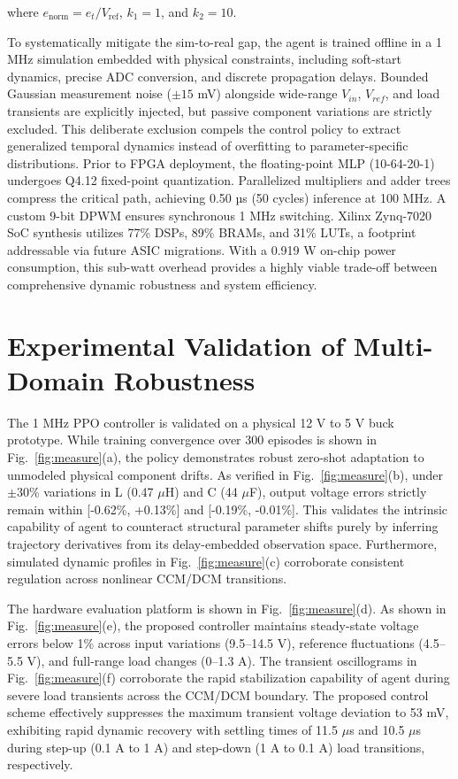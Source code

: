 \documentclass[a4paper,12pt]{article}
\begin{document}
\noindent
where $e_{\text{norm}} = e_t / V_{\text{ref}}$, $k_1 = 1$, and $k_2 = 10$.

To systematically mitigate the sim-to-real gap, the agent is trained offline in a 1 MHz simulation embedded with physical constraints, including soft-start dynamics, precise ADC conversion, and discrete propagation delays. Bounded Gaussian measurement noise ($\pm 15$ mV) alongside wide-range $V_{in}$, $V_{ref}$, and load transients are explicitly injected, but passive component variations are strictly excluded. This deliberate exclusion compels the control policy to extract generalized temporal dynamics instead of overfitting to parameter-specific distributions. Prior to FPGA deployment, the floating-point MLP (10-64-20-1) undergoes Q4.12 fixed-point quantization. Parallelized multipliers and adder trees compress the critical path, achieving 0.50 µs (50 cycles) inference at 100 MHz. A custom 9-bit DPWM ensures synchronous 1 MHz switching. Xilinx Zynq-7020 SoC synthesis utilizes 77\% DSPs, 89\% BRAMs, and 31\% LUTs, a footprint addressable via future ASIC migrations. With a 0.919 W on-chip power consumption, this sub-watt overhead provides a highly viable trade-off between comprehensive dynamic robustness and system efficiency.

\vspace{-10pt}  %
\section{Experimental Validation of Multi-Domain Robustness}
\vspace{-5pt}  %

The 1 MHz PPO controller is validated on a physical 12 V to 5 V buck prototype. While training convergence over 300 episodes is shown in Fig.~\ref{fig:measure}(a), the policy demonstrates robust zero-shot adaptation to unmodeled physical component drifts. As verified in Fig.~\ref{fig:measure}(b), under $\pm$30\% variations in L (0.47 $\mu$H) and C (44 $\mu$F), output voltage errors strictly remain within [-0.62\%, +0.13\%] and [-0.19\%, -0.01\%]. This validates the intrinsic capability of agent to counteract structural parameter shifts purely by inferring trajectory derivatives from its delay-embedded observation space. Furthermore, simulated dynamic profiles in Fig.~\ref{fig:measure}(c) corroborate consistent regulation across nonlinear CCM/DCM transitions.

The hardware evaluation platform is shown in Fig.~\ref{fig:measure}(d). As shown in Fig.~\ref{fig:measure}(e), the proposed controller maintains steady-state voltage errors below 1\% across input variations (9.5–14.5 V), reference fluctuations (4.5–5.5 V), and full-range load changes (0–1.3 A). The transient oscillograms in Fig.~\ref{fig:measure}(f) corroborate the rapid stabilization capability of agent during severe load transients across the CCM/DCM boundary. The proposed control scheme effectively suppresses the maximum transient voltage deviation to 53 mV, exhibiting rapid dynamic recovery with settling times of 11.5 $\mu$s and 10.5 $\mu$s during step-up (0.1 A to 1 A) and step-down (1 A to 0.1 A) load transitions, respectively.
\end{document}
